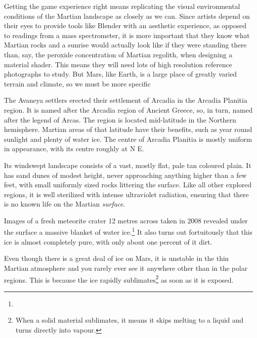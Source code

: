 


Getting the game experience right means replicating the visual environmental conditions of the Martian landscape as closely as we can. Since artists depend on their eyes to provide tools like Blender with an aesthetic experience, as opposed to readings from a mass spectrometer, it is more important that they know what Martian rocks and a sunrise would actually look like if they were standing there than, say, the peroxide concentration of Martian regolith, when designing a material shader. This means they will need lots of high resolution reference photographs to study. But Mars, like Earth, is a large place of greatly varied terrain and climate, so we must be more specific

The Avaneya settlers erected their settlement of Arcadia in the Arcadia Planitia region. It is named after the Arcadia region of Ancient Greece, so, in turn, named after the legend of Arcas. The region is located mid-latitude in the Northern hemisphere. Martian areas of that latitude have their benefits, such as year round sunlight and plenty of water ice. The centre of Arcadia Planitia is mostly uniform in appearance, with its centre roughly at N E.

Its windswept landscape consists of a vast, mostly flat, pale tan coloured plain. It has sand dunes of modest height, never approaching anything higher than a few feet, with small uniformly sized rocks littering the surface. Like all other explored regions, it is well sterilized with intense ultraviolet radiation, ensuring that there is no known life on the Martian {\it surface}.

Images of a fresh meteorite crater 12 metres across taken in 2008 revealed under the surface a massive blanket of water ice.\footnote{} It also turns out fortuitously that this ice is almost completely pure, with only about one percent of it dirt.

Even though there is a great deal of ice on Mars, it is unstable in the thin Martian atmosphere and you rarely ever see it anywhere other than in the polar regions. This is because the ice rapidly sublimates\footnote{When a solid material sublimates, it means it skips melting to a liquid and turns directly into vapour.} as soon as it is exposed.

